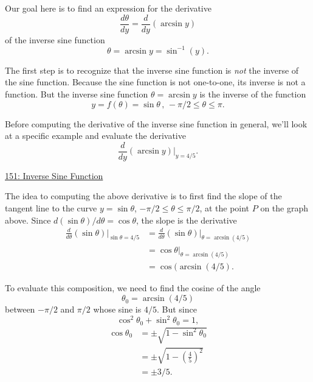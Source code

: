 \documentclass{ximera}
\begin{document}
Our goal here is to find an expression for the derivative
\[
       \frac{d\theta}{dy} = \frac{d}{dy} \left(   \arcsin y \right)
\]
of the inverse sine function
\[
       \theta = \arcsin y = \sin^{-1}(y) .
\]

The first step is to recognize that the inverse sine function is \emph{not} the inverse of the sine function. Because the sine function is not one-to-one, its inverse is not a function. But the inverse sine function $\theta = \arcsin y$ is the inverse of the function
\[
  y = f(\theta) = \sin\theta \, , \, -\pi/2 \leq \theta \leq \pi.
\]

\begin{example} \label{ExLKDFrsfD}
Before computing the derivative of the inverse sine function in general, we'll look at a specific example and evaluate the derivative
\[
   \frac{d}{dy} \left(  \arcsin y \right) \Big|_{y=4/5} .
\]

\begin{onlineOnly}
    \begin{center}
\end{center}
\end{onlineOnly}

\href{https://www.desmos.com/calculator/alp2mnxqhc}{151: Inverse Sine Function}

The idea to computing the above derivative is to first find the slope of the tangent line to the curve $y=\sin\theta$, $-\pi/2 \leq \theta \leq \pi/2$, at the point $P$ on the graph above. Since $d(\sin\theta)/d\theta = \cos\theta$, the slope is the derivative
\begin{align*}
    \frac{d}{d\theta} \left(\sin\theta \right) \Big|_{\sin\theta = 4/5} &=  \frac{d}{d\theta} \left(\sin\theta \right) \Big|_{\theta = \arcsin(4/5)}  \\
                         &= \cos\theta        \Big|_{\theta = \arcsin(4/5)}  \\                                                       
 & = \cos (\arcsin(4/5).
\end{align*}

To evaluate this composition, we need to find the cosine of the angle 
\[
    \theta_0 = \arcsin(4/5)
\]
between $-\pi/2$ and $\pi/2$ whose sine is $4/5$. But since 
\[
  \cos^2\theta_0 + \sin^2\theta_0 = 1 ,
\] 
\begin{align*}
  \cos\theta_0 &= \pm \sqrt{1-\sin^2\theta_0} \\
                      &= \pm \sqrt{1-\left(\frac{4}{5}\right)^2} \\
                      &= \pm 3/5 .
\end{align*}


\end{example}
\end{document}
